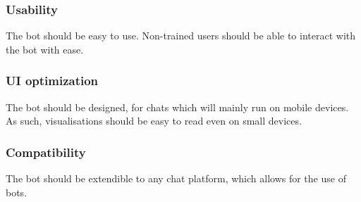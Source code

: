 \subsubsection{Usability} The bot should be easy to use. Non-trained users should be able to interact with the bot with ease.

\subsubsection{UI optimization} The bot should be designed, for chats which will mainly run on mobile devices. As such, visualisations should be easy to read even on small devices.

\subsubsection{Compatibility} The bot should be extendible to any chat platform, which allows for the use of bots.

